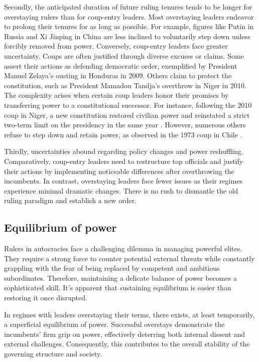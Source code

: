 \documentclass[
  12pt,
  a4paper,
  12pt]{article}
\begin{document}
Secondly, the anticipated duration of future ruling tenures tends to be
longer for overstaying rulers than for coup-entry leaders. Most
overstaying leaders endeavor to prolong their tenures for as long as
possible. For example, figures like Putin in Russia and Xi Jinping in
China are less inclined to voluntarily step down unless forcibly removed
from power. Conversely, coup-entry leaders face greater uncertainty.
Coups are often justified through diverse excuses or claims. Some assert
their actions as defending democratic order, exemplified by President
Manuel Zelaya's ousting in Honduras in 2009. Others claim to protect the
constitution, such as President Mamadou Tandja's overthrow in Niger in
2010. The complexity arises when certain coup leaders honor their
promises by transferring power to a constitutional successor. For
instance, following the 2010 coup in Niger, a new constitution restored
civilian power and reinstated a strict two-term limit on the presidency
in the same year \citep{ginsburg2019}. However, numerous others refuse
to step down and retain power, as observed in the 1973 coup in Chile
\citep{ökten2022}.

Thirdly, uncertainties abound regarding policy changes and power
reshuffling. Comparatively, coup-entry leaders need to restructure top
officials and justify their actions by implementing noticeable
differences after overthrowing the incumbents. In contrast, overstaying
leaders face fewer issues as their regimes experience minimal dramatic
changes. There is no rush to dismantle the old ruling paradigm and
establish a new order.

\hypertarget{equilibrium-of-power}{%
\subsection{Equilibrium of power}\label{equilibrium-of-power}}

Rulers in autocracies face a challenging dilemma in managing powerful
elites. They require a strong force to counter potential external
threats while constantly grappling with the fear of being replaced by
competent and ambitious subordinates. Therefore, maintaining a delicate
balance of power becomes a sophisticated skill. It's apparent that
sustaining equilibrium is easier than restoring it once disrupted.

In regimes with leaders overstaying their terms, there exists, at least
temporarily, a superficial equilibrium of power. Successful overstays
demonstrate the incumbents' firm grip on power, effectively deterring
both internal dissent and external challenges. Consequently, this
contributes to the overall stability of the governing structure and
society.
\end{document}
